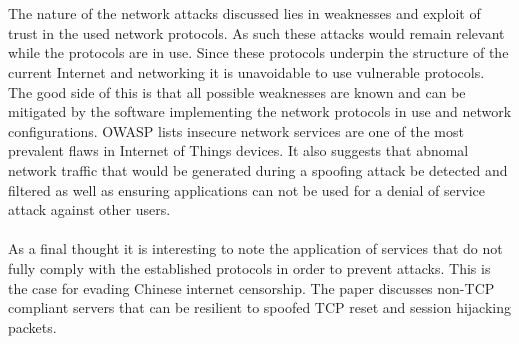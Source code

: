 \\
\\
The nature of the network attacks discussed lies in weaknesses and exploit of trust in the used network protocols. As such these attacks would remain relevant while the protocols are in use. Since these protocols underpin the structure of the current Internet and networking it is unavoidable to use vulnerable protocols. The good side of this is that all possible weaknesses are known and can be mitigated by the software implementing the network protocols in use and network configurations. OWASP \cite{owasp_network} lists insecure network services are one of the most prevalent flaws in Internet of Things devices. It also suggests that abnomal network traffic that would be generated during a spoofing attack be detected and filtered as well as ensuring applications can not be used for a denial of service attack against other users.
\\
\\
As a final thought it is interesting to note the application of services that do not fully comply with the established protocols in order to prevent attacks. This is the case for evading Chinese internet censorship. The paper \cite{china} discusses non-TCP compliant servers that can be resilient to spoofed TCP reset and session hijacking packets.
